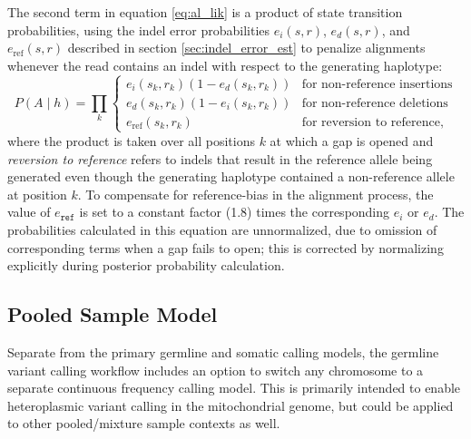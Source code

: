 \documentclass{article}
\begin{document}
The second term in equation \ref{eq:al_lik} is a product of state transition probabilities, using the indel error probabilities $e_i(s,r)$, $e_d(s,r)$, and $e_{\text{ref}}(s,r)$ described in section \ref{sec:indel_error_est} to penalize alignments whenever the read contains an indel with respect to the generating haplotype:
\begin{equation*}
\label{eq:transition_probs}
P(A \mid h) = \prod_k \left\{
\begin{array}{ll}
e_i(s_k,r_k)(1-e_d(s_k,r_k)) & \textrm{for~non-reference~insertions}\\
e_d(s_k,r_k)(1-e_i(s_k,r_k)) & \textrm{for~non-reference~deletions}\\
e_{\text{ref}}(s_k,r_k) & \textrm{for~reversion~to~reference},
\end{array}
\right.
\end{equation*}
where the product is taken over all positions $k$ at which a gap is opened and \emph{reversion to reference} refers to indels that result in the reference allele being generated even though the generating haplotype contained a non-reference allele at position $k$. To compensate for reference-bias in the alignment process, the value of $e_\texttt{ref}$ is set to a constant factor (1.8) times the corresponding $e_i$ or $e_d$. The probabilities calculated in this equation are unnormalized, due to omission of corresponding terms when a gap fails to open; this is corrected by normalizing explicitly during posterior probability calculation.

\subsection{Pooled Sample Model}

Separate from the primary germline and somatic calling models, the germline variant calling workflow includes an option to switch any chromosome to a separate continuous frequency calling model. This is primarily intended to enable heteroplasmic variant calling in the mitochondrial genome, but could be applied to other pooled/mixture sample contexts as well.
\end{document}
